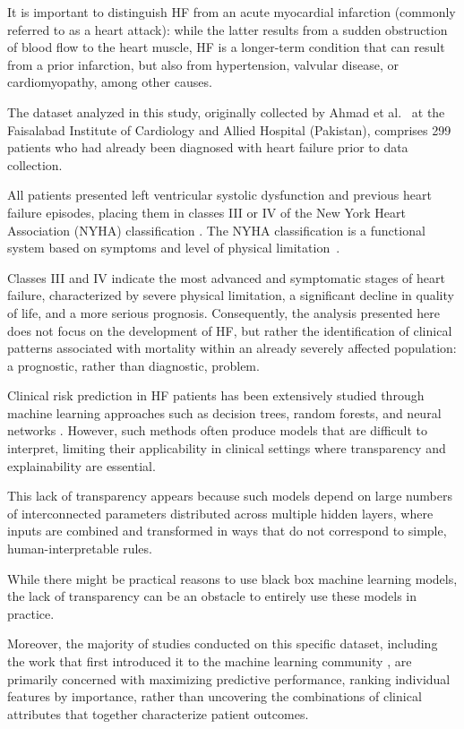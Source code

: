 \documentclass[a4paper,twoside]{article}
\begin{document}
It is important to distinguish HF from an acute myocardial infarction (commonly referred to as a heart attack): while the latter results from a sudden obstruction of blood flow to the heart muscle, HF is a longer-term condition that can result from a prior infarction, but also from hypertension, valvular disease, or cardiomyopathy, among other causes.

The dataset analyzed in this study, originally collected by Ahmad et al.~\cite{Ahmad2017} at the Faisalabad Institute of Cardiology and Allied Hospital (Pakistan), comprises 299 patients who had already been diagnosed with heart failure prior to data collection.

All patients presented left ventricular systolic dysfunction and previous heart failure episodes, placing them in classes III or IV of the New York Heart Association (NYHA) classification \cite{Ahmad2017}. The NYHA classification is a functional system based on symptoms and level of physical limitation~\cite{NYHA1994}.

Classes III and IV indicate the most advanced and symptomatic stages of heart failure, characterized by severe physical limitation, a significant decline in quality of life, and a more serious prognosis. Consequently, the analysis presented here does not focus on the development of HF, but rather the identification of clinical patterns associated with mortality within an already severely affected population: a prognostic, rather than diagnostic, problem.

Clinical risk prediction in HF patients has been extensively studied through machine learning approaches such as decision trees, random forests, and neural networks \cite{Ahmad2017,ChiccoJurman2020}. However, such methods often produce models that are difficult to interpret, limiting their applicability in clinical settings where transparency and explainability are essential.

This lack of transparency appears because such models depend on large numbers of interconnected parameters distributed across multiple hidden layers, where inputs are combined and transformed in ways that do not correspond to simple, human-interpretable rules.

While there might be practical reasons to use black box machine learning models, the lack of transparency can be an obstacle to entirely use these models in practice.

Moreover, the majority of studies conducted on this specific dataset, including the work that first introduced it to the machine learning community \cite{ChiccoJurman2020}, are primarily concerned with maximizing predictive performance, ranking individual features by importance, rather than uncovering the combinations of clinical attributes that together characterize patient outcomes.
\end{document}
